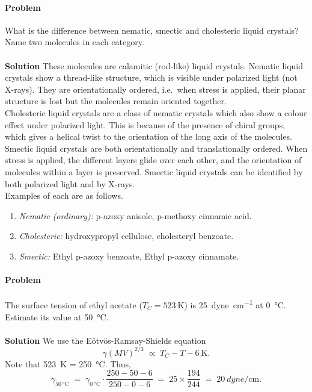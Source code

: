\documentclass[10pt]{article}
\newcounter{prob}
\def\problem{\stepcounter{prob}\paragraph{Problem \arabic{prob}}}
\def\solution{\\\\\textbf{Solution }}
\begin{document}
        \problem What is the difference between nematic, smectic and cholesteric liquid crystals? Name two molecules in each category.
        \solution These molecules are calamitic (rod-like) liquid crystals. Nematic liquid crystals show a thread-like structure, which is visible under
        polarized light (not X-rays). They are orientationally ordered, i.e.\ when stress is applied, their planar structure is lost but the molecules
        remain oriented together.\\

        Cholesteric liquid crystals are a class of nematic crystals which also show a colour effect under polarized light.
        This is because of the presence of chiral groups, which gives a helical twist to the orientation of the long axis of the molecules. \\

        Smectic liquid crystals are both orientationally and translationally ordered. When stress is applied, the different layers glide over each
        other, and the orientation of molecules within a layer is preserved. Smectic liquid crystals can be identified by both polarized light
        and by X-rays. \\

        Examples of each are as follows.
        \begin{enumerate}[label=(\roman*), itemsep=0pt, topsep=\parsep]
                \item \textit{Nematic (ordinary):} p-azoxy anisole, p-methoxy cinnamic acid.
                \item \textit{Cholesteric:} hydroxypropyl cellulose, cholesteryl benzoate.
                \item \textit{Smectic:} Ethyl p-azoxy benzoate, Ethyl p-azoxy cinnamate.
        \end{enumerate}
        

        \problem The surface tension of ethyl acetate ($T_C = \SI{523}{\kelvin}$) is \SI{25}{dyne\per\cm} at \SI{0}{\celsius}.
        Estimate its value at \SI{50}{\celsius}.
        \solution We use the E\"otv\"os-Ramsay-Shields equation
        \[
        \gamma(MV)^{2 /3} \;\propto\; T_C - T - \SI{6}{\kelvin}.
        \]
        Note that \SI{523}{\kelvin} = \SI{250}{\celsius}. Thus,
        \[
        \gamma_{\SI{50}{\celsius}} \;=\; \gamma_{\SI{0}{\celsius}}\cdot\frac{250 - 50 - 6}{250 - 0 - 6} \;=\; 25\times\frac{194}{244} \;=\; 
                \SI{20}{dyne\per\cm}.
        \]
\end{document}
